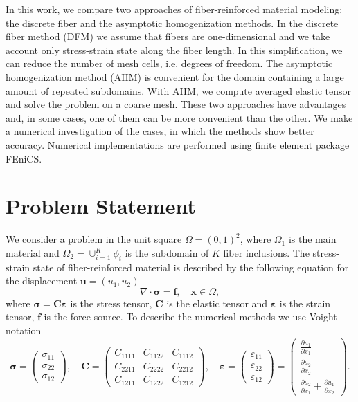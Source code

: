 \documentclass[a4paper]{jpconf}
\begin{document}
In this work, we compare two approaches of fiber-reinforced material modeling: the discrete fiber and the asymptotic homogenization methods. In the discrete fiber method (DFM) we assume that fibers are one-dimensional and we take account only stress-strain state along the fiber length. In this simplification, we can reduce the number of mesh cells, i.e. degrees of freedom. The asymptotic homogenization method (AHM)\cite{pinho-da-crus2009asymptotic,oliveira2009asymptotic,pellegrino1999numerical,yuan2008toward} is convenient for the domain containing a large amount of repeated subdomains. With AHM, we compute averaged elastic tensor and solve the problem on a coarse mesh. These two approaches have advantages and, in some cases, one of them can be more convenient than the other. We make a numerical investigation of the cases, in which the methods show better accuracy. Numerical implementations are performed using finite element package FEniCS\cite{fenics2012}.

\section{Problem Statement} 

We consider a problem in the unit square $\Omega=(0,1)^2$, where $\Omega_1$ is the main material and $\Omega_2=\cup_{i=1}^K \phi_i$ is the subdomain of $K$ fiber inclusions.
The stress-strain state of fiber-reinforced material is described by the following equation for the displacement $\bm{u}=(u_1, u_2)$
\begin{equation}
\nabla \cdot \bm{\sigma} = \bm{f}, \quad \bm{x} \in \Omega,
\label{eq:displacement}
\end{equation}
where $\bm{\sigma}=\bm{C}\bm{\varepsilon}$ is the stress tensor, $\bm{C}$ is the elastic tensor and $\bm{\varepsilon}$ is the strain tensor, $\bm{f}$ is the force source.
To describe the numerical methods we use Voight notation
\[
\bm{\sigma} = \left(
\begin{matrix}\sigma_{11}\\ \sigma_{22}\\ \sigma_{12}\end{matrix}
\right), \quad
\bm{C} = \left( \begin{matrix}
C_{1111} & C_{1122} & C_{1112}  \\
C_{2211} & C_{2222} & C_{2212}  \\
C_{1211} & C_{1222} & C_{1212}  
\end{matrix}  \right), \quad
\bm{\varepsilon} = \left(
\begin{matrix}\varepsilon_{11}\\ \varepsilon_{22}\\ \varepsilon_{12}\end{matrix}
\right) = \left( \begin{matrix}\frac{\partial u_1}{\partial x_1}\\ \frac{\partial u_2}{\partial x_2} \\ \frac{\partial u_2}{\partial x_1} + \frac{\partial u_1}{\partial x_2} \end{matrix} \right).
\]
\end{document}
